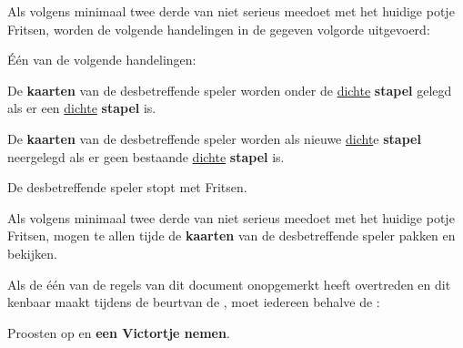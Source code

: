 
\vervolgLijst{}
\item Als \eenSpeler volgens minimaal twee derde van \alleSpelers niet serieus meedoet met het huidige potje Fritsen, worden de volgende handelingen in de gegeven volgorde uitgevoerd:
\numeriekeLijst{}
\item Één van de volgende handelingen:
\puntLijst{}
\item De \textbf{kaarten} van de desbetreffende speler worden onder de \ul{dichte} \textbf{stapel} gelegd als er een \ul{dichte} \textbf{stapel} is.
\item De \textbf{kaarten} van de desbetreffende speler worden als nieuwe \ul{dicht}e \textbf{stapel} neergelegd als er geen bestaande \ul{dichte} \textbf{stapel} is.
\eindPuntLijst{}
\item De desbetreffende speler stopt met Fritsen.
\eindNumeriekeLijst{}
\eindLijst{}

\vervolgLijst{}
\item Als \eenSpeler volgens minimaal twee derde van \alleSpelers niet serieus meedoet met het huidige potje Fritsen, mogen \alleSpelers te allen tijde de \textbf{kaarten} van de desbetreffende speler pakken en bekijken.
\eindLijst{}


\vervolgLijst{}
\item Als de \vorigeSpeler één van de regels van dit document onopgemerkt heeft overtreden en dit kenbaar maakt tijdens de beurt\footnotemark[1] van de \huidigeSpelerN, moet iedereen behalve de \vorigeSpelerN:
\puntLijst{}
\item Proosten op  en \textbf{een Victortje nemen}\footnotemark[2].
\eindPuntLijst{}
\eindLijst{}


\newpage
{}
\label{hoofdstuk:beginfase_start}


